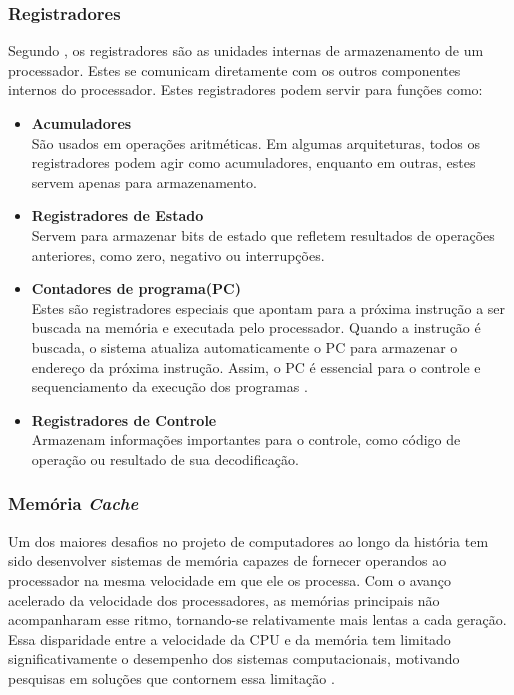 \documentclass[
	12pt,				%
	openright,			%
	oneside,			%
	a4paper,			%
	english,			%
	french,				%
	spanish,			%
	brazil,				%
	]{abntex2}
\begin{document}
\subsubsection{Registradores}
Segundo , os registradores são as unidades internas de armazenamento de um processador. Estes se comunicam diretamente com os outros componentes internos do processador. Estes registradores podem servir para funções como:
\begin{itemize}
    \item \textbf{Acumuladores}\\
    São usados em operações aritméticas. Em algumas arquiteturas, todos os registradores podem agir como acumuladores, enquanto em outras, estes servem apenas para armazenamento.
    \item \textbf{Registradores de Estado}\\
    Servem para armazenar bits de estado que refletem resultados de operações anteriores, como zero, negativo ou interrupções.
    \item \textbf{Contadores de programa(PC)}\\
     Estes são registradores especiais que apontam para a próxima instrução a ser buscada na memória e executada pelo processador. Quando a instrução é buscada, o sistema atualiza automaticamente o PC para armazenar o endereço da próxima instrução. Assim, o PC é essencial para o controle e sequenciamento da execução dos programas \cite{favero_organizacao_2011}.
     \item \textbf{Registradores de Controle}\\
     Armazenam informações importantes para o controle, como código de operação ou resultado de sua decodificação.
\end{itemize}

\subsubsection{Memória \textit{Cache}}

Um dos maiores desafios no projeto de computadores ao longo da história tem sido desenvolver sistemas de memória capazes de fornecer operandos ao processador na mesma velocidade em que ele os processa. Com o avanço acelerado da velocidade dos processadores, as memórias principais não acompanharam esse ritmo, tornando-se relativamente mais lentas a cada geração. Essa disparidade entre a velocidade da CPU e da memória tem limitado significativamente o desempenho dos sistemas computacionais, motivando pesquisas em soluções que contornem essa limitação \cite[p.304]{tanenbaum_structured_2013}.
\end{document}
